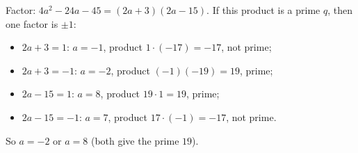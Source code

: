 Factor: $4a^2-24a-45=(2a+3)(2a-15)$. If this product is a prime $q$, then one factor is $\pm1$:
\begin{itemize}
\item $2a+3=1$: $a=-1$, product $1\cdot(-17)=-17$, not prime;
\item $2a+3=-1$: $a=-2$, product $(-1)(-19)=19$, prime;
\item $2a-15=1$: $a=8$, product $19\cdot1=19$, prime;
\item $2a-15=-1$: $a=7$, product $17\cdot(-1)=-17$, not prime.
\end{itemize}
So $\boxed{a=-2\text{ or }a=8}$ (both give the prime $19$).

